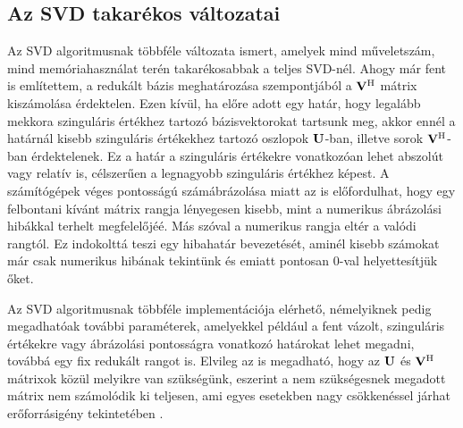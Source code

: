         \subsection{Az SVD takarékos változatai}
            Az SVD algoritmusnak többféle változata ismert, amelyek mind műveletszám, mind memóriahasználat terén takarékosabbak a teljes SVD-nél. Ahogy már fent is említettem, a redukált bázis meghatározása szempontjából a ${\bf V^{\mathrm{H}}}$ mátrix kiszámolása érdektelen. Ezen kívül, ha előre adott egy határ, hogy legalább mekkora szinguláris értékhez tartozó bázisvektorokat tartsunk meg, akkor ennél a határnál kisebb szinguláris értékekhez tartozó oszlopok ${\bf U}$-ban, illetve sorok ${\bf V}^{\mathrm{H}}$-ban érdektelenek. Ez a határ a szinguláris értékekre vonatkozóan lehet abszolút vagy relatív is, célszerűen a legnagyobb szinguláris értékhez képest. A számítógépek véges pontosságú számábrázolása miatt az is előfordulhat, hogy egy felbontani kívánt mátrix rangja lényegesen kisebb, mint a numerikus ábrázolási hibákkal terhelt megfelelőjéé. Más szóval a numerikus rangja eltér a valódi rangtól. Ez indokolttá teszi egy hibahatár bevezetését, aminél kisebb számokat már csak numerikus hibának tekintünk és emiatt pontosan 0-val helyettesítjük őket.
            \par
            Az SVD algoritmusnak többféle implementációja elérhető, némelyiknek pedig megadhatóak további paraméterek, amelyekkel például a fent vázolt, szinguláris értékekre vagy ábrázolási pontosságra vonatkozó határokat lehet megadni, továbbá egy fix redukált rangot is. Elvileg az is megadható, hogy az ${\bf U}$ és ${\bf V^{\mathrm{H}}}$ mátrixok közül melyikre van szükségünk, eszerint a nem szükségesnek megadott mátrix nem számolódik ki teljesen, ami egyes esetekben nagy csökkenéssel járhat erőforrásigény tekintetében \cite{Golub70}.
            \par
